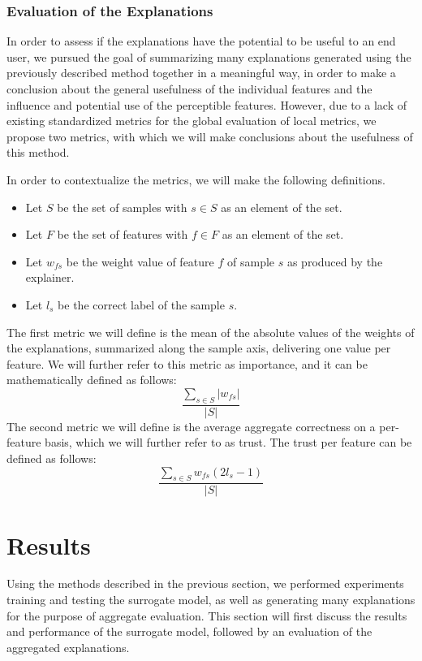 \documentclass{article}
\begin{document}
			\subsubsection{Evaluation of the Explanations}
			In order to assess if the explanations have the potential to be useful to an end
			user, we pursued the goal of summarizing many explanations generated using the
			previously described method together in a meaningful way, in order to make a
			conclusion about the general usefulness of the individual features and the influence
			and potential use of the perceptible features. However, due to a lack of existing
			standardized metrics for the global evaluation of local metrics, we propose two
			metrics, with which we will make conclusions about the usefulness of this method.
			\par
			In order to contextualize the metrics, we will make the following definitions.
			\begin{itemize}
				\item Let \(S\) be the set of samples with \(s \in S\) as an element of the set.
				\item Let \(F\) be the set of features with \(f \in F\) as an element of the set.
				\item Let \(w_{fs}\) be the weight value of feature \(f\) of sample \(s\) as
					produced by the explainer.
				\item Let \(l_{s}\) be the correct label of the sample \(s\).
			\end{itemize}
			The first metric we will define is the mean of the absolute values of the weights of
			the explanations, summarized along the sample axis, delivering one value per feature.
			We will further refer to this metric as importance, and it can be mathematically
			defined as follows:
			\[\frac{\sum_{s \in S} |w_{fs}|}{|S|}\]
			The second metric we will define is the average aggregate correctness on a per-feature
			basis, which we will further refer to as trust. The trust per feature can be defined as
			follows:
			\[\frac{\sum_{s \in S} w_{fs}(2l_{s}-1)}{|S|}\]
	\section{Results}
	Using the methods described in the previous section, we performed experiments training and
	testing the surrogate model, as well as generating many explanations for the purpose of
	aggregate evaluation. This section will first discuss the results and performance of the
	surrogate model, followed by an evaluation of the aggregated explanations.
\end{document}

